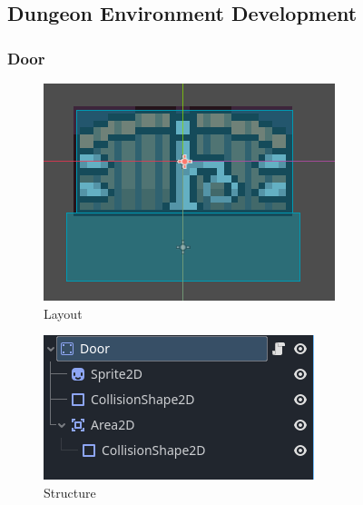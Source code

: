 \documentclass{article}
\begin{document}
        \subsection{Dungeon Environment Development}
        \subsubsection{Door}
        \begin{multicols}{2}
                \begin{figure}[H]
                        \centering
                        \includegraphics[width = 0.9\columnwidth]{images/development/Door_layout.PNG}
                        \caption{Layout}
                \end{figure}
                \begin{figure}[H]
                        \centering
                        \includegraphics[width = 0.9\columnwidth]{images/development/Door_structure.PNG}
                        \caption{Structure}
                \end{figure}   
        \end{multicols}
\end{document}
